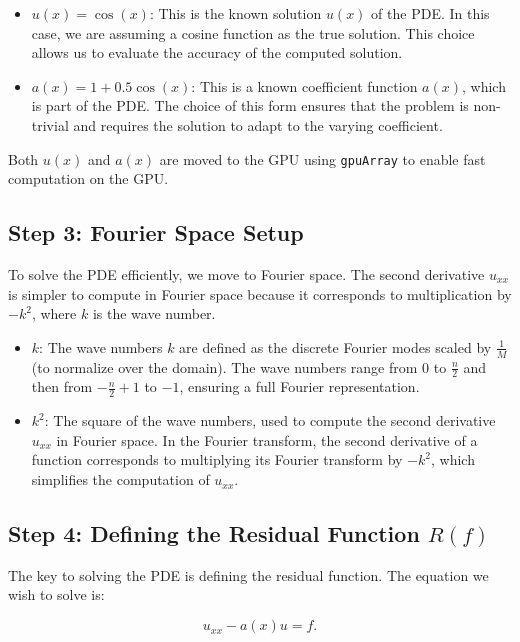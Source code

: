 \documentclass{article}
\begin{document}
\begin{itemize}
    \item \( u(x) = \cos(x) \): This is the known solution \( u(x) \) of the PDE. In this case, we are assuming a cosine function as the true solution. This choice allows us to evaluate the accuracy of the computed solution.
    \item \( a(x) = 1 + 0.5 \cos(x) \): This is a known coefficient function \( a(x) \), which is part of the PDE. The choice of this form ensures that the problem is non-trivial and requires the solution to adapt to the varying coefficient.
\end{itemize}

Both \( u(x) \) and \( a(x) \) are moved to the GPU using \texttt{gpuArray} to enable fast computation on the GPU.

\subsection*{Step 3: Fourier Space Setup}

To solve the PDE efficiently, we move to Fourier space. The second derivative \( u_{xx} \) is simpler to compute in Fourier space because it corresponds to multiplication by \( -k^2 \), where \( k \) is the wave number.

\begin{itemize}
    \item \( k \): The wave numbers \( k \) are defined as the discrete Fourier modes scaled by \( \frac{1}{M} \) (to normalize over the domain). The wave numbers range from \( 0 \) to \( \frac{n}{2} \) and then from \( -\frac{n}{2}+1 \) to \( -1 \), ensuring a full Fourier representation.
    \item \( k^2 \): The square of the wave numbers, used to compute the second derivative \( u_{xx} \) in Fourier space. In the Fourier transform, the second derivative of a function corresponds to multiplying its Fourier transform by \( -k^2 \), which simplifies the computation of \( u_{xx} \).
\end{itemize}

\subsection*{Step 4: Defining the Residual Function \( R(f) \)}

The key to solving the PDE is defining the residual function. The equation we wish to solve is:

\[
u_{xx} - a(x) u = f.
\]
\end{document}
